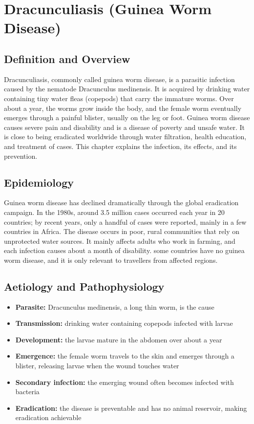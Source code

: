 \chapter{Dracunculiasis (Guinea Worm Disease)}

\section*{Definition and Overview}
Dracunculiasis, commonly called guinea worm disease, is a parasitic infection caused by the nematode Dracunculus medinensis. It is acquired by drinking water containing tiny water fleas (copepods) that carry the immature worms. Over about a year, the worms grow inside the body, and the female worm eventually emerges through a painful blister, usually on the leg or foot. Guinea worm disease causes severe pain and disability and is a disease of poverty and unsafe water. It is close to being eradicated worldwide through water filtration, health education, and treatment of cases. This chapter explains the infection, its effects, and its prevention.

\section*{Epidemiology}
Guinea worm disease has declined dramatically through the global eradication campaign. In the 1980s, around 3.5 million cases occurred each year in 20 countries; by recent years, only a handful of cases were reported, mainly in a few countries in Africa. The disease occurs in poor, rural communities that rely on unprotected water sources. It mainly affects adults who work in farming, and each infection causes about a month of disability. some countries have no guinea worm disease, and it is only relevant to travellers from affected regions.

\section*{Aetiology and Pathophysiology}
\begin{itemize}
    \item \textbf{Parasite:} Dracunculus medinensis, a long thin worm, is the cause
    \item \textbf{Transmission:} drinking water containing copepods infected with larvae
    \item \textbf{Development:} the larvae mature in the abdomen over about a year
    \item \textbf{Emergence:} the female worm travels to the skin and emerges through a blister, releasing larvae when the wound touches water
    \item \textbf{Secondary infection:} the emerging wound often becomes infected with bacteria
    \item \textbf{Eradication:} the disease is preventable and has no animal reservoir, making eradication achievable
\end{itemize}


